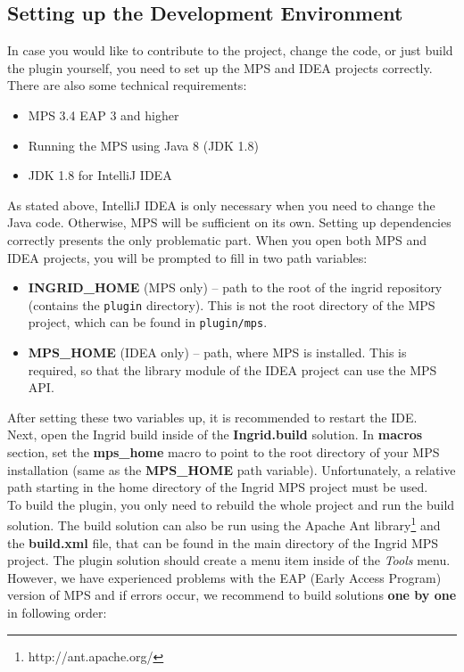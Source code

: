 \subsection{Setting up the Development Environment}
\label{chap:dev_env}

In case you would like to contribute to the project, change the code, or just build the plugin yourself, you need to set up the MPS and IDEA projects correctly.
There are also some technical requirements:

\begin{itemize}
	\item MPS 3.4 EAP 3 and higher
	\item Running the MPS using Java 8 (JDK 1.8)
	\item JDK 1.8 for IntelliJ IDEA
\end{itemize}

As stated above, IntelliJ IDEA is only necessary when you need to change the Java code.
Otherwise, MPS will be sufficient on its own.
Setting up dependencies correctly presents the only problematic part.
When you open both MPS and IDEA projects, you will be prompted to fill in two path variables:

\begin{itemize}
	\item \textbf{INGRID{\_}HOME} (MPS only) -- path to the root of the ingrid repository (contains the \texttt{plugin} directory). This is not the root directory of the MPS project, which can be found in \texttt{plugin/mps}.

	\item \textbf{MPS{\_}HOME} (IDEA only) -- path, where MPS is installed. This is required, so that the library module of the IDEA project can use the MPS API.
\end{itemize}

After setting these two variables up, it is recommended to restart the IDE.
\\

Next, open the Ingrid build inside of the \textbf{Ingrid.build} solution. In \textbf{macros} section, set the \textbf{mps{\_}home} macro to point to the root directory of your MPS installation (same as the \textbf{MPS{\_}HOME} path variable).
Unfortunately, a relative path starting in the home directory of the Ingrid MPS project must be used.
\\

To build the plugin, you only need to rebuild the whole project and run the build solution.
The build solution can also be run using the Apache Ant library\footnote{http://ant.apache.org/} and the \textbf{build.xml} file, that can be found in the main directory of the Ingrid MPS project.
The plugin solution should create a menu item inside of the \textit{Tools} menu.
However, we have experienced problems with the EAP (Early Access Program) version of MPS and if errors occur, we recommend to build solutions \textbf{one by one} in following order:

